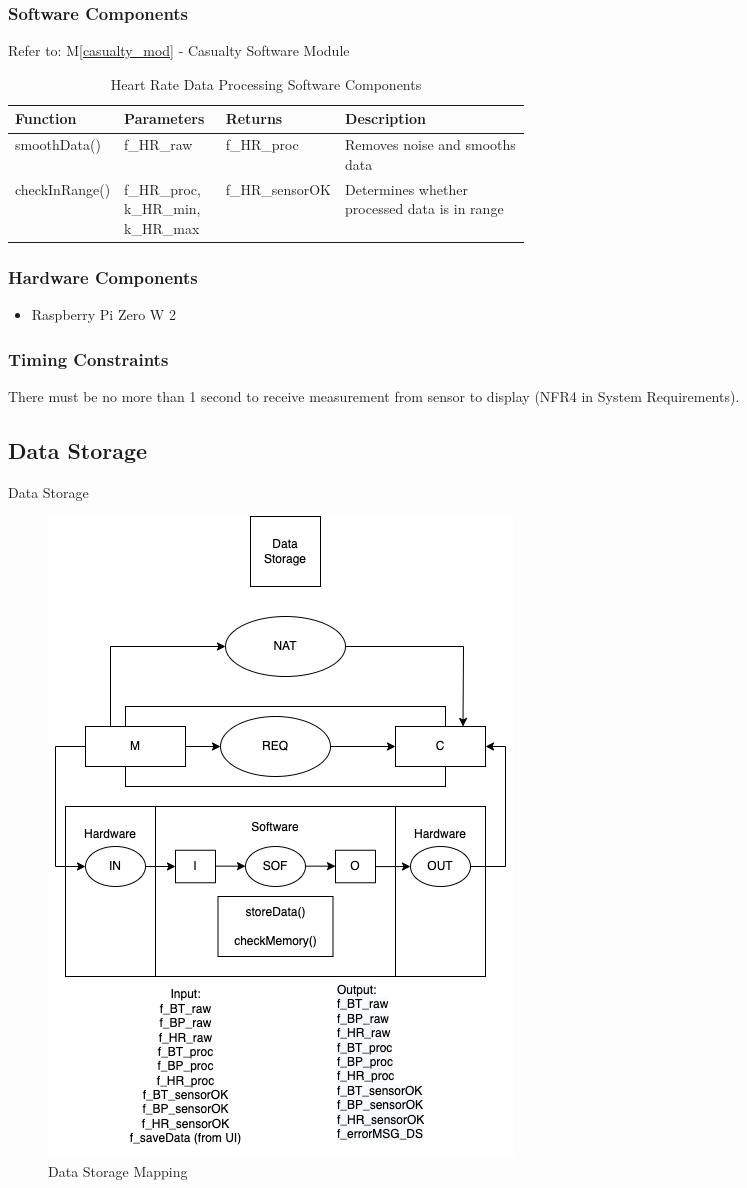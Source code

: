 \documentclass{article}
\newcounter{mnum}
\newcommand{\mthemnum}{M\themnum}
\begin{document}
\begin{description}
        \subsubsection{Software Components}
        Refer to: M\ref{casualty_mod} - Casualty Software Module
                \begin{longtable}{|l|p{0.2\linewidth}|l|p{0.4\linewidth}|}
                \caption{Heart Rate Data Processing Software Components}
                \hline
                \textbf{Function} & \textbf{Parameters} & \textbf {Returns} & \textbf{Description} \\
                \endhead
                \hline
                smoothData()   & f\_HR\_raw & f\_HR\_proc & Removes noise and smooths data \\
                \hline
                checkInRange() & f\_HR\_proc, k\_HR\_min, k\_HR\_max & f\_HR\_sensorOK & Determines whether processed data is in range \\
                \hline
                \end{longtable}
            \noindent
        \subsubsection{Hardware Components}
            \begin{itemize}
            \item Raspberry Pi Zero W 2
            \end{itemize}
        \subsubsection{Timing Constraints}
        There must be no more than 1 second to receive measurement from sensor to display (NFR4 in System Requirements).
    \newpage
    
    \subsection{Data Storage}
    \item [\refstepcounter{mnum} \mthemnum \label{DS}:] Data Storage
    \begin{figure}[!htb]
    	\centering
    	\includegraphics[width=0.5\linewidth]{mccharts-DataStorage.drawio.png}
    	\caption{Data Storage Mapping}
    \end{figure}

\end{description}
\end{document}
